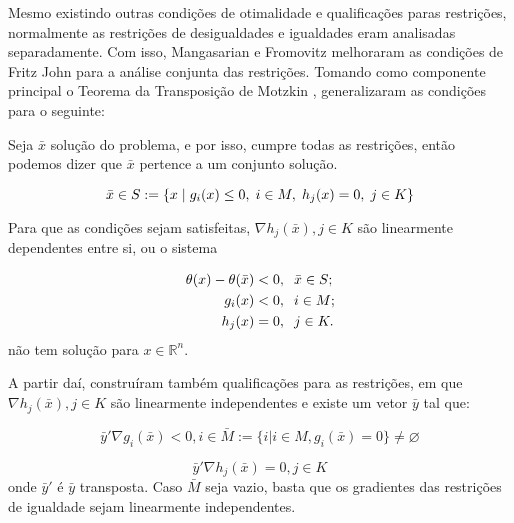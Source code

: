 Mesmo existindo outras condições de otimalidade e qualificações paras restrições, normalmente
as restrições de desigualdades e igualdades eram analisadas separadamente. Com isso, Mangasarian
e Fromovitz  \cite{mangasarian1967fritz} melhoraram as condições de Fritz John para a análise
conjunta das restrições. Tomando como componente principal o Teorema da Transposição de Motzkin
\cite{Nemirovski}, generalizaram as condições para o seguinte:

Seja \( \bar x \) solução do problema, e por isso, cumpre todas as restrições, então podemos
dizer que \(\bar x\) pertence a um conjunto solução.

\begin{equation}
    \bar x \in S :=\{ x \hspace{0.1cm} | \hspace{0.1cm} g_i(x) \leq 0, \hspace{0.1cm} i \in M, \hspace{0.1cm} h_j(x) = 0, \hspace{0.1cm} j \in K \}
\end{equation}


Para que as condições sejam satisfeitas, \( \nabla h_j(\bar x), j \in K\) são linearmente dependentes
entre si, ou o sistema

\begin{equation}
\begin{split}
  \theta(x) - \theta(\bar x) & < 0, \hspace{0.2cm} \bar x \in S; \\
  g_i(x)                     & < 0, \hspace{0.2cm} i \in M; \\
  h_j(x)                     & = 0, \hspace{0.2cm} j \in K.
\end{split}
\end{equation}
não tem solução para \( x \in \mathbb{R}^n \).


A partir daí, construíram também qualificações para as restrições, em que \( \nabla h_j(\bar x), j \in K\)
são linearmente independentes e existe um vetor \(\bar y\) tal que:

\begin{equation}
  \bar y' \nabla g_i(\bar x) < 0, i \in \bar M := \{i | i \in M, g_i(\bar x) = 0 \} \neq \varnothing
\end{equation}

\begin{equation}
\bar y' \nabla h_j(\bar x) = 0, j \in K
\end{equation}
onde \( \bar y' \) é \(\bar y\) transposta. Caso \(\bar M\) seja vazio, basta que os gradientes das
restrições de igualdade sejam linearmente independentes.




